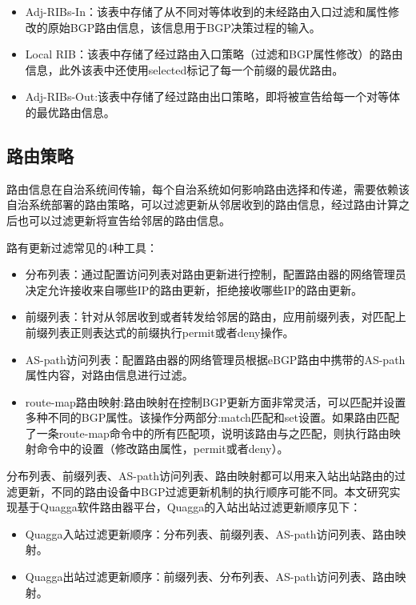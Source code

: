 \begin{itemize}
    \item Adj-RIBs-In：该表中存储了从不同对等体收到的未经路由入口过滤和属性修改的原始BGP路由信息，该信息用于BGP决策过程的输入。
    \item Local RIB：该表中存储了经过路由入口策略（过滤和BGP属性修改）的路由信息，此外该表中还使用selected标记了每一个前缀的最优路由。
    \item Adj-RIBs-Out:该表中存储了经过路由出口策略，即将被宣告给每一个对等体的最优路由信息。
  \end{itemize}

\subsection{路由策略}
路由信息在自治系统间传输，每个自治系统如何影响路由选择和传递，需要依赖该自治系统部署的路由策略\cite{DianeTeare2016CCNP}，可以过滤更新从邻居收到的路由信息，经过路由计算之后也可以过滤更新将宣告给邻居的路由信息。

路有更新过滤常见的4种工具\cite{Kocharians2015CCIE}：
\begin{itemize}
    \item 分布列表：通过配置访问列表对路由更新进行控制，配置路由器的网络管理员决定允许接收来自哪些IP的路由更新，拒绝接收哪些IP的路由更新。
    \item 前缀列表：针对从邻居收到或者转发给邻居的路由，应用前缀列表，对匹配上前缀列表正则表达式的前缀执行permit或者deny操作。
    \item AS-path访问列表：配置路由器的网络管理员根据eBGP路由中携带的AS-path属性内容，对路由信息进行过滤。
    \item route-map路由映射:路由映射在控制BGP更新方面非常灵活，可以匹配并设置多种不同的BGP属性。该操作分两部分:match匹配和set设置。如果路由匹配了一条route-map命令中的所有匹配项，说明该路由与之匹配，则执行路由映射命令中的设置（修改路由属性，permit或者deny）。
\end{itemize}


分布列表、前缀列表、AS-path访问列表、路由映射都可以用来入站出站路由的过滤更新，不同的路由设备中BGP过滤更新机制的执行顺序可能不同。本文研究实现基于Quagga\cite{quagga}软件路由器平台，Quagga的入站出站过滤更新顺序见下：

\begin{itemize}
\item Quagga入站过滤更新顺序：分布列表、前缀列表、AS-path访问列表、路由映射。
\item Quagga出站过滤更新顺序：前缀列表、分布列表、AS-path访问列表、路由映射。
\end{itemize}

